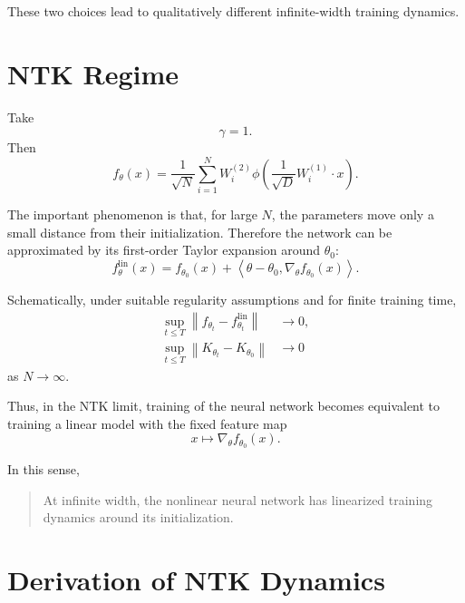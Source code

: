 These two choices lead to qualitatively different infinite-width
training dynamics.

\section{NTK Regime}

Take
\[
\gamma=1.
\]
Then
\begin{equation}
    f_\theta(x)
    =
    \frac{1}{\sqrt{N}}
    \sum_{i=1}^{N}
    W_i^{(2)}
    \phi\!\left(
        \frac{1}{\sqrt{D}}
        W_i^{(1)}\cdot x
    \right).
\end{equation}

The important phenomenon is that, for large \(N\), the parameters move
only a small distance from their initialization. Therefore the network
can be approximated by its first-order Taylor expansion around
\(\theta_0\):
\begin{equation}
    \boxed{
    f_\theta^{\mathrm{lin}}(x)
    =
    f_{\theta_0}(x)
    +
    \left\langle
        \theta-\theta_0,
        \nabla_\theta f_{\theta_0}(x)
    \right\rangle.
    }
\end{equation}

Schematically, under suitable regularity assumptions and for finite
training time,
\begin{align}
    \sup_{t\leq T}
    \left\|
        f_{\theta_t}
        -
        f_{\theta_t}^{\mathrm{lin}}
    \right\|
    &\longrightarrow 0,
    \\
    \sup_{t\leq T}
    \left\|
        K_{\theta_t}
        -
        K_{\theta_0}
    \right\|
    &\longrightarrow 0
\end{align}
as \(N\rightarrow\infty\).

Thus, in the NTK limit, training of the neural network becomes
equivalent to training a linear model with the fixed feature map
\[
x
\mapsto
\nabla_\theta f_{\theta_0}(x).
\]

In this sense,

\begin{quote}
At infinite width, the nonlinear neural network has linearized training
dynamics around its initialization.
\end{quote}

\section{Derivation of NTK Dynamics}

